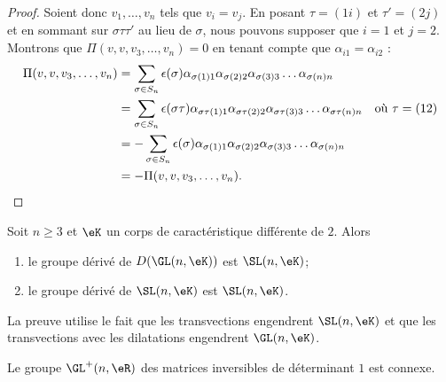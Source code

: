 \begin{proof}
    Soient donc \( v_1,\ldots, v_n\) tels que \( v_i=v_j\). En posant \( \tau=(1i)\) et \( \tau'=(2j)\) et en sommant sur \( \sigma\tau\tau'\) au lieu de \( \sigma\), nous pouvons supposer que \( i=1\) et \( j=2\). Montrons que \( \Pi(v,v,v_3,\ldots, v_n)=0\) en tenant compte que \( \alpha_{i1}=\alpha_{i2}\) :
    \begin{subequations}
        \begin{align}
            \Pi(v,v,v_3,\ldots, v_n)&=\sum_{\sigma\in S_n}\epsilon(\sigma)\alpha_{\sigma(1)1}\alpha_{\sigma(2)2}\alpha_{\sigma(3)3}\ldots \alpha_{\sigma(n)n}\\
            &=\sum_{\sigma\in S_n}\epsilon(\sigma\tau)\alpha_{\sigma\tau(1)1}\alpha_{\sigma\tau(2)2}\alpha_{\sigma\tau(3)3}\ldots \alpha_{\sigma\tau(n)n}&\text{où \( \tau=(12)\)}\\
            &=-\sum_{\sigma\in S_n}\epsilon(\sigma)\alpha_{\sigma(1)1}\alpha_{\sigma(2)2}\alpha_{\sigma(3)3}\ldots \alpha_{\sigma(n)n} \\
            &=-\Pi(v,v,v_3,\ldots, v_n).
        \end{align}
    \end{subequations}
\end{proof}

\begin{proposition}
    Soit \( n\geq 3\) et \( \eK\) un corps de caractéristique différente de \( 2\). Alors
    \begin{enumerate}
        \item
            le groupe dérivé de \( D(\GL(n,\eK))\) est \(\SL(n,\eK)\);  
        \item
            le groupe dérivé de \( \SL(n,\eK)\) est \( \SL(n,\eK)\).
    \end{enumerate}
\end{proposition}
La preuve utilise le fait que les transvections engendrent \( \SL(n,\eK)\) et que les transvections avec les dilatations engendrent \( \GL(n,\eK)\).

\begin{proposition}\label{PropYGBEECo}
    Le groupe \( \GL^+(n,\eR)\) des matrices inversibles de déterminant \( 1\) est connexe.
\end{proposition}

